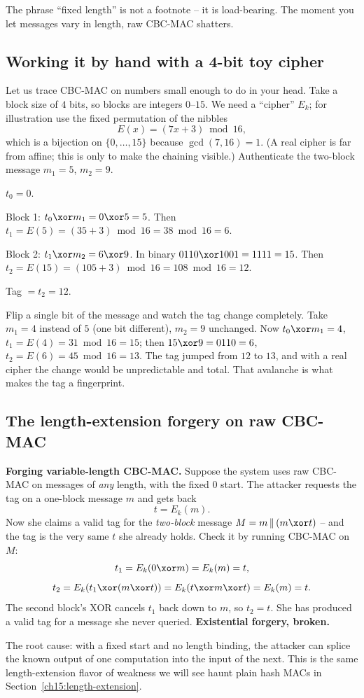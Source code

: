 The phrase ``fixed length'' is not a footnote -- it is load-bearing. The moment you let messages vary in length, raw CBC-MAC shatters.

\subsection{Working it by hand with a 4-bit toy cipher}
\label{ch15:cbcmac-toy}

Let us trace CBC-MAC on numbers small enough to do in your head. Take a block size of $4$ bits, so blocks are integers $0$--$15$. We need a ``cipher'' $E_k$; for illustration use the fixed permutation of the nibbles
\[
  E(x) = (7x + 3) \bmod 16,
\]
which is a bijection on $\{0,\dots,15\}$ because $\gcd(7,16)=1$. (A real cipher is far from affine; this is only to make the chaining visible.) Authenticate the two-block message $m_1 = 5$, $m_2 = 9$.

\begin{walkbox}
$t_0 = 0$.

Block 1: $t_0\xor m_1 = 0\xor 5 = 5$. Then $t_1 = E(5) = (35+3)\bmod 16 = 38\bmod 16 = 6$.

Block 2: $t_1\xor m_2 = 6\xor 9$. In binary $0110\xor 1001 = 1111 = 15$. Then $t_2 = E(15) = (105+3)\bmod 16 = 108\bmod 16 = 12$.

Tag $= t_2 = 12$.
\end{walkbox}

Flip a single bit of the message and watch the tag change completely. Take $m_1 = 4$ instead of $5$ (one bit different), $m_2=9$ unchanged. Now $t_0\xor m_1 = 4$, $t_1 = E(4) = 31\bmod 16 = 15$; then $15\xor 9 = 0110 = 6$, $t_2 = E(6) = 45\bmod 16 = 13$. The tag jumped from $12$ to $13$, and with a real cipher the change would be unpredictable and total. That avalanche is what makes the tag a fingerprint.

\subsection{The length-extension forgery on raw CBC-MAC}
\label{ch15:cbcmac-attack}

\begin{attackbox}
\textbf{Forging variable-length CBC-MAC.} Suppose the system uses raw CBC-MAC on messages of \emph{any} length, with the fixed $0$ start. The attacker requests the tag on a one-block message $m$ and gets back
\[
  t = E_k(m).
\]
Now she claims a valid tag for the \emph{two-block} message $M = m \,\|\, (m \xor t)$ -- and the tag is the very same $t$ she already holds. Check it by running CBC-MAC on $M$:
\[
  t_1 = E_k(0\xor m) = E_k(m) = t,
\]
\[
  t_2 = E_k(t_1 \xor (m\xor t)) = E_k(t \xor m \xor t) = E_k(m) = t.
\]
The second block's XOR cancels $t_1$ back down to $m$, so $t_2 = t$. She has produced a valid tag for a message she never queried. \textbf{Existential forgery, broken.}

The root cause: with a fixed start and no length binding, the attacker can splice the known output of one computation into the input of the next. This is the same length-extension flavor of weakness we will see haunt plain hash MACs in Section~\ref{ch15:length-extension}.
\end{attackbox}

